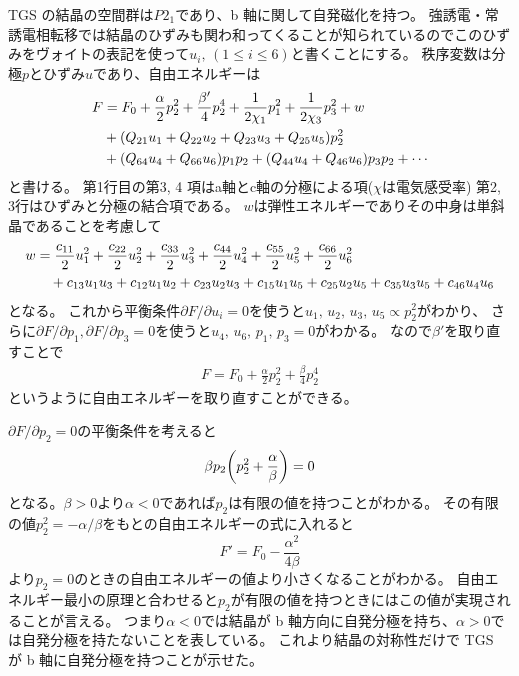 \documentclass[11pt,dvipdfmx,a4paper]{jsarticle}
\begin{document}
TGS の結晶の空間群は\(P2_1\)であり、b 軸に関して自発磁化を持つ。
強誘電・常誘電相転移では結晶のひずみも関わ和ってくることが知られているのでこのひずみをヴォイトの表記を使って\(u_i,\,(1\leq i \leq6)\)と書くことにする。
秩序変数は分極\(p\)とひずみ\(u\)であり、自由エネルギーは
\begin{align}
    F
    &= F_0 + \frac{\alpha}{2}p_2^2 + \frac{\beta'}{4}p_2^4+\frac{1}{2\chi_1}p_1^2+\frac{1}{2\chi_3}p_3^2 + w \notag\\
    &+(Q_{21}u_1+Q_{22}u_2+Q_{23}u_3 + Q_{25}u_5)p_2^2 \notag\\
    &+(Q_{64}u_4+Q_{66}u_6)p_1 p_2 +(Q_{44}u_4+Q_{46}u_6)p_3 p_2+\cdots
\end{align}
と書ける\cite{ishibashi}。
第1行目の第3, 4 項はa軸とc軸の分極による項(\(\chi\)は電気感受率)
第2, 3行はひずみと分極の結合項である。
\(w\)は弾性エネルギーでありその中身は単斜晶であることを考慮して
\begin{align}
    w
    &= \frac{c_{11}}{2}u_1^2 + \frac{c_{22}}{2}u_2^2 + \frac{c_{33}}{2}u_3^2 + \frac{c_{44}}{2}u_4^2 + \frac{c_{55}}{2}u_5^2 + \frac{c_{66}}{2}u_6^2 \notag\\
    &\quad + c_{13}u_1u_3 + c_{12}u_1u_2 + c_{23}u_2u_3 +c_{15}u_1u_5 +c_{25}u_2u_5 +c_{35}u_3u_5 +c_{46}u_4u_6
\end{align}
となる。
これから平衡条件\(\partial F/ \partial u_i = 0\)を使うと\(u_1,\,u_2,\,u_3,\,u_5 \propto p_2^2\)がわかり、
さらに\(\partial F/ \partial p_1, \partial F/ \partial p_3 = 0\)を使うと\(u_4,\,u_6,\,p_1,\,p_3 = 0\)がわかる。
なので\(\beta'\)を取り直すことで
\begin{align}
    F = F_0 + \frac{\alpha}{2}p_2^2 + \frac{\beta}{4}p_2^4
\end{align}
というように自由エネルギーを取り直すことができる。

\(\partial F/ \partial p_2 = 0\)の平衡条件を考えると
\begin{align}
    \beta p_2 \qty(p_2^2+\frac{\alpha}{\beta})=0
\end{align}
となる。\(\beta > 0\)より\(\alpha<0\)であれば\(p_2\)は有限の値を持つことがわかる。
その有限の値\(p_2^2 = -\alpha/\beta\)をもとの自由エネルギーの式に入れると
\begin{equation}
    F' = F_0 -\frac{\alpha^2}{4\beta}
\end{equation}
より\(p_2=0\)のときの自由エネルギーの値より小さくなることがわかる。
自由エネルギー最小の原理と合わせると\(p_2\)が有限の値を持つときにはこの値が実現されることが言える。
つまり\(\alpha<0\)では結晶が b 軸方向に自発分極を持ち、\(\alpha>0\)では自発分極を持たないことを表している。
これより結晶の対称性だけで TGS が b 軸に自発分極を持つことが示せた。
\end{document}
